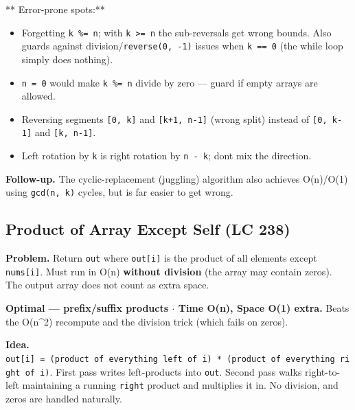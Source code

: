 \documentclass[11pt]{article}
\providecommand{\tightlist}{\setlength{\itemsep}{1pt}\setlength{\parskip}{0pt}}
\begin{document}
** Error-prone spots:**

\begin{itemize}
\tightlist
\item
  Forgetting \texttt{k\ \%=\ n}; with \texttt{k\ \textgreater{}=\ n} the sub-reversals get wrong bounds. Also guards against division/\texttt{reverse(0,\ -1)} issues when \texttt{k\ ==\ 0} (the while loop simply does nothing).
\item
  \texttt{n\ =\ 0} would make \texttt{k\ \%=\ n} divide by zero --- guard if empty arrays are allowed.
\item
  Reversing segments \texttt{{[}0,\ k{]}} and \texttt{{[}k+1,\ n-1{]}} (wrong split) instead of \texttt{{[}0,\ k-1{]}} and \texttt{{[}k,\ n-1{]}}.
\item
  Left rotation by \texttt{k} is right rotation by \texttt{n\ -\ k}; don\textquotesingle t mix the direction.
\end{itemize}

\textbf{Follow-up.} The cyclic-replacement (juggling) algorithm also achieves O(n)/O(1) using \texttt{gcd(n,\ k)} cycles, but is far easier to get wrong.

\subsection{Product of Array Except Self (LC 238)}\label{product-of-array-except-self-lc-238}

\textbf{Problem.} Return \texttt{out} where \texttt{out{[}i{]}} is the product of all elements except \texttt{nums{[}i{]}}. Must run in O(n) \textbf{without division} (the array may contain zeros). The output array does not count as extra space.

\textbf{Optimal --- prefix/suffix products \(\cdot\) Time O(n), Space O(1) extra.} Beats the O(n\^{}2) recompute and the division trick (which fails on zeros).

\textbf{Idea.} \texttt{out{[}i{]}\ =\ (product\ of\ everything\ left\ of\ i)\ *\ (product\ of\ everything\ right\ of\ i)}. First pass writes left-products into \texttt{out}. Second pass walks right-to-left maintaining a running \texttt{right} product and multiplies it in. No division, and zeros are handled naturally.

\end{document}
